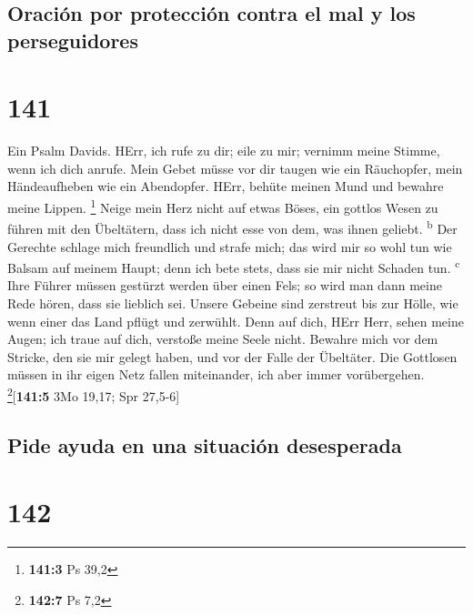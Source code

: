 \hypertarget{oraciuxf3n-por-protecciuxf3n-contra-el-mal-y-los-perseguidores}{%
\subsection{Oración por protección contra el mal y los
perseguidores}\label{oraciuxf3n-por-protecciuxf3n-contra-el-mal-y-los-perseguidores}}

\hypertarget{section-140}{%
\section{141}\label{section-140}}

 Ein Psalm Davids. HErr, ich rufe zu dir; eile zu mir;
vernimm meine Stimme, wenn ich dich anrufe.  Mein Gebet
müsse vor dir taugen wie ein Räuchopfer, mein Händeaufheben wie ein
Abendopfer.  HErr, behüte meinen Mund und bewahre meine
Lippen. \footnote{\textbf{141:3} Ps 39,2}  Neige mein Herz
nicht auf etwas Böses, ein gottlos Wesen zu führen mit den Übeltätern,
dass ich nicht esse von dem, was ihnen geliebt. \textsuperscript{b}
 Der Gerechte schlage mich freundlich und strafe mich; das
wird mir so wohl tun wie Balsam auf meinem Haupt; denn ich bete stets,
dass sie mir nicht Schaden tun. \textsuperscript{c}  Ihre
Führer müssen gestürzt werden über einen Fels; so wird man dann meine
Rede hören, dass sie lieblich sei.  Unsere Gebeine sind
zerstreut bis zur Hölle, wie wenn einer das Land pflügt und zerwühlt.
 Denn auf dich, HErr Herr, sehen meine Augen; ich traue
auf dich, verstoße meine Seele nicht.  Bewahre mich vor
dem Stricke, den sie mir gelegt haben, und vor der Falle der Übeltäter.
 Die Gottlosen müssen in ihr eigen Netz fallen
miteinander, ich aber immer vorübergehen. \footnote{\textbf{142:7} Ps
  7,2}{[}\textbf{141:5} 3Mo 19,17; Spr 27,5-6{]}

\hypertarget{pide-ayuda-en-una-situaciuxf3n-desesperada}{%
\subsection{Pide ayuda en una situación
desesperada}\label{pide-ayuda-en-una-situaciuxf3n-desesperada}}

\hypertarget{section-141}{%
\section{142}\label{section-141}}


